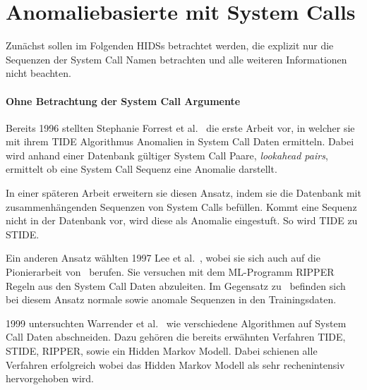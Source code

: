     \section{Anomaliebasierte  mit System Calls}

        Zunächst sollen im Folgenden \acp{HIDS} betrachtet werden, die explizit nur die Sequenzen der System Call Namen betrachten und alle weiteren Informationen nicht beachten.

        \paragraph{Ohne Betrachtung der System Call Argumente}\label{sec:related_no_arg}
                Bereits 1996 stellten Stephanie Forrest et al.~\cite{FORREST} die erste Arbeit vor, in welcher sie mit ihrem \ac{TIDE} Algorithmus Anomalien in System Call Daten ermitteln.
                Dabei wird anhand einer Datenbank gültiger System Call Paare, \textit{lookahead pairs}, ermittelt ob eine System Call Sequenz eine Anomalie darstellt.

                In einer späteren Arbeit erweitern sie diesen Ansatz, indem sie die Datenbank mit zusammenhängenden Sequenzen von System Calls befüllen.
                Kommt eine Sequenz nicht in der Datenbank vor, wird diese als Anomalie eingestuft.
                So wird \ac{TIDE} zu \ac{STIDE}.~\cite{STIDE}

                Ein anderen Ansatz wählten 1997 Lee et al.~\cite{LEE1997}, wobei sie sich auch auf die Pionierarbeit von~\cite{FORREST} berufen.
                Sie versuchen mit dem \ac{ML}-Programm RIPPER Regeln aus den System Call Daten abzuleiten.
                Im Gegensatz zu~\cite{FORREST} befinden sich bei diesem Ansatz normale sowie anomale Sequenzen in den Trainingsdaten.

                1999 untersuchten Warrender et al.~\cite{STIDE_Alternatives} wie verschiedene Algorithmen auf System Call Daten abschneiden.
                Dazu gehören die bereits erwähnten Verfahren \ac{TIDE}, \ac{STIDE}, RIPPER, sowie ein Hidden Markov Modell.
                Dabei schienen alle Verfahren erfolgreich wobei das Hidden Markov Modell als sehr rechenintensiv hervorgehoben wird.
         
